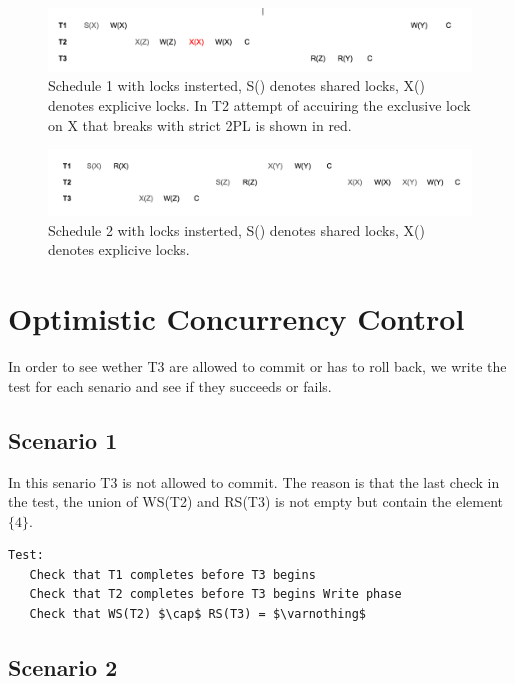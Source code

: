 \documentclass{article}
\theoremstyle{plain}
\theoremstyle{nonumberplain}
\begin{document}
\begin{figure}[h]
    \centering
    \includegraphics[width=14cm]{schedule1_withlocks}
    \caption{Schedule 1 with locks insterted, S() denotes shared locks, X() denotes explicive locks. In T2 attempt of accuiring the exclusive lock on X that breaks with strict 2PL is shown in red. }
    \label{fig:schedule1_withlocks}
\end{figure} 

\begin{figure}[h]
    \centering
    \includegraphics[width=14cm]{schedule2_withlocks}
    \caption{Schedule 2 with locks insterted, S() denotes shared locks, X() denotes explicive locks.}
    \label{fig:schedule2_withlocks}
\end{figure} 

\section{Optimistic Concurrency Control}
In order to see wether T3 are allowed to commit or has to roll back, we write the test for each senario and see if they succeeds or fails. 

\subsection{Scenario 1}

In this senario T3 is not allowed to commit. The reason is that the last check in the test, the union of WS(T2) and RS(T3) is not empty but contain the element $\{4\}$.

\begin{lstlisting}[mathescape]
Test:
   Check that T1 completes before T3 begins
   Check that T2 completes before T3 begins Write phase
   Check that WS(T2) $\cap$ RS(T3) = $\varnothing$
\end{lstlisting}

\subsection{Scenario 2}
\end{document}
